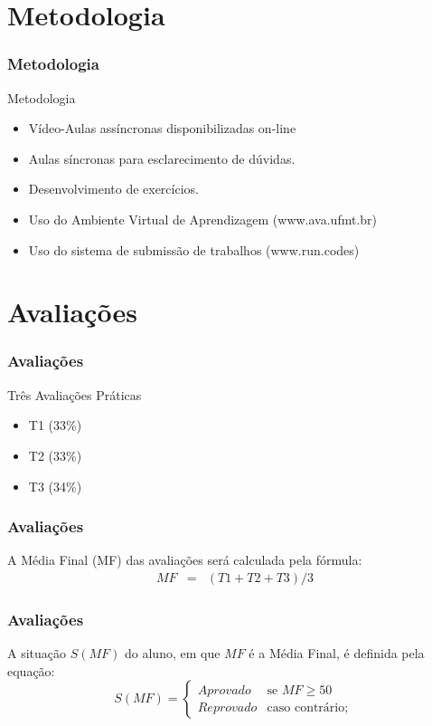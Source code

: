 \documentclass[aspectratio=169]{beamer}
\begin{document}
\section{Metodologia}

\begin{frame}
\frametitle{Metodologia}
Metodologia
\begin{itemize}
 \item Vídeo-Aulas assíncronas disponibilizadas on-line
 \item Aulas síncronas para esclarecimento de dúvidas.
 \item Desenvolvimento de exercícios.
 \item Uso do Ambiente Virtual de Aprendizagem (www.ava.ufmt.br)
 \item Uso do sistema de submissão de trabalhos (www.run.codes)
\end{itemize}
\end{frame}

\section{Avaliações}

\begin{frame}
\frametitle{Avaliações}
Três Avaliações Práticas 
\begin{itemize}
 \item T1 (33\%)
 \item T2 (33\%)
 \item T3 (34\%) 
\end{itemize}
\end{frame}


\begin{frame}
\frametitle{Avaliações}
 A Média Final (MF) das avaliações será calculada pela fórmula: 
 \begin{eqnarray}
   MF &=& (T1 + T2 + T3) / 3 \nonumber
 \end{eqnarray}
\end{frame}

\begin{frame}
\frametitle{Avaliações}
A situação $S(MF)$ do aluno, em que $MF$ é a Média Final, é definida pela equação:
\begin{equation}
\label{fib}
  S(MF)=
  \left\{
   \begin{array}{ll}
    Aprovado & \mbox{se\ }MF\geq 50 \\
    Reprovado & \mbox{caso contrário};\
   \end{array}
  \right.\nonumber
\end{equation}
\end{frame}
\end{document}
